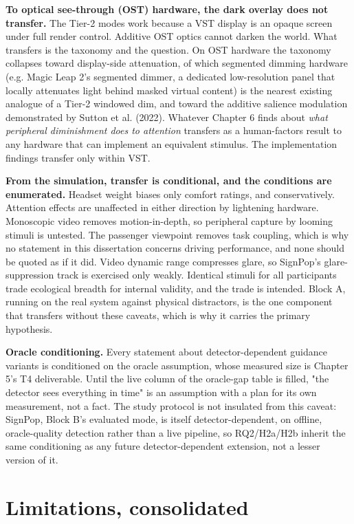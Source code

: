 \textbf{To optical see-through (OST) hardware, the dark overlay does not transfer.} The Tier-2 modes
work because a VST display is an opaque screen under full render control. Additive OST optics
cannot darken the world. What transfers is the taxonomy and the question. On OST hardware the
taxonomy collapses toward display-side attenuation, of which segmented dimming hardware (e.g.
Magic Leap 2's segmented dimmer, a dedicated low-resolution panel that locally attenuates light behind masked virtual content) is the nearest existing analogue of a
Tier-2 windowed dim, and toward the additive salience modulation demonstrated by Sutton et al.
(2022). Whatever Chapter 6 finds about \textit{what peripheral diminishment does to attention} transfers
as a human-factors result to any hardware that can implement an equivalent stimulus. The
implementation findings transfer only within VST.

\textbf{From the simulation, transfer is conditional, and the conditions are enumerated.} Headset weight
biases only comfort ratings, and conservatively. Attention effects are unaffected in either
direction by lightening hardware. Monoscopic video removes motion-in-depth, so peripheral capture
by looming stimuli is untested. The passenger viewpoint removes task coupling, which is why no
statement in this dissertation concerns driving performance, and none should be quoted as if it
did. Video dynamic range compresses glare, so SignPop's glare-suppression track is exercised only
weakly. Identical stimuli for all participants trade ecological breadth for internal validity, and
the trade is intended. Block A, running on the real system against physical distractors, is the one
component that transfers without these caveats, which is why it carries the primary hypothesis.

\textbf{Oracle conditioning.} Every statement about detector-dependent guidance variants is conditioned
on the oracle assumption, whose measured size is Chapter 5's T4 deliverable. Until the live column
of the oracle-gap table is filled, "the detector sees everything in time" is an assumption with a
plan for its own measurement, not a fact. The study protocol is not insulated from this caveat:
SignPop, Block B's evaluated mode, is itself detector-dependent, on offline, oracle-quality
detection rather than a live pipeline, so RQ2/H2a/H2b inherit the same conditioning as any future
detector-dependent extension, not a lesser version of it.

\section{Limitations, consolidated}

